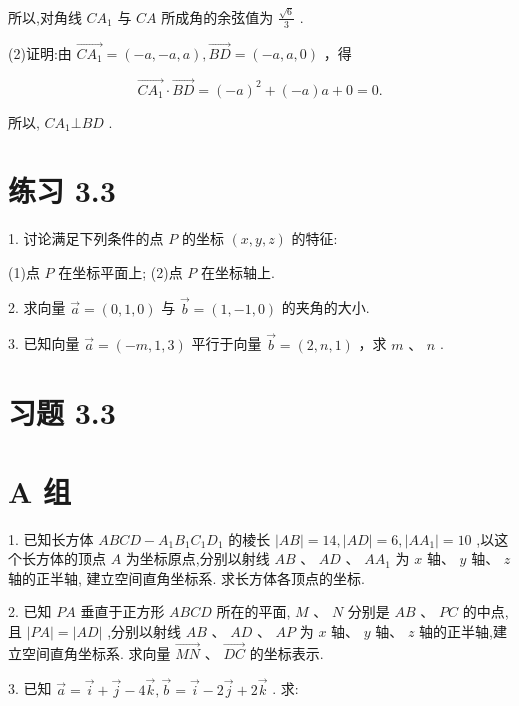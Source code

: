 \documentclass[10pt]{article}
\begin{document}
所以,对角线 \(C{A}_{1}\) 与 \({CA}\) 所成角的余弦值为 \(\frac{\sqrt{6}}{3}\) .

(2)证明:由 \(\overrightarrow{C{A}_{1}} = \left( {-a, - a,a}\right) ,\overrightarrow{BD} = \left( {-a,a,0}\right)\) ，得

\[
\overrightarrow{C{A}_{1}} \cdot  \overrightarrow{BD} = {\left( -a\right) }^{2} + \left( {-a}\right) a + 0 = 0.
\]

所以, \(C{A}_{1} \bot  {BD}\) .

\section*{练习 3.3}

1. 讨论满足下列条件的点 \(P\) 的坐标 \(\left( {x,y,z}\right)\) 的特征:

(1)点 \(P\) 在坐标平面上; (2)点 \(P\) 在坐标轴上.

2. 求向量 \(\overrightarrow{a} = \left( {0,1,0}\right)\) 与 \(\overrightarrow{b} = \left( {1, - 1,0}\right)\) 的夹角的大小.

3. 已知向量 \(\overrightarrow{a} = \left( {-m,1,3}\right)\) 平行于向量 \(\overrightarrow{b} = \left( {2,n,1}\right)\) ，求 \(m\text{ 、 }n\) .

\section*{习题 3.3}

\section*{A 组}

1. 已知长方体 \({ABCD} - {A}_{1}{B}_{1}{C}_{1}{D}_{1}\) 的棱长 \(\left| {AB}\right|  = {14},\left| {AD}\right|  = 6,\left| {A{A}_{1}}\right|  = {10}\) ,以这个长方体的顶点 \(A\) 为坐标原点,分别以射线 \({AB}\text{ 、 }{AD}\text{ 、 }A{A}_{1}\) 为 \(x\) 轴、 \(y\) 轴、 \(z\) 轴的正半轴, 建立空间直角坐标系. 求长方体各顶点的坐标.

2. 已知 \({PA}\) 垂直于正方形 \({ABCD}\) 所在的平面, \(M\text{ 、 }N\) 分别是 \({AB}\text{ 、 }{PC}\) 的中点,且 \(\left| {PA}\right|  = \left| {AD}\right|\) ,分别以射线 \({AB}\text{ 、 }{AD}\text{ 、 }{AP}\) 为 \(x\) 轴、 \(y\) 轴、 \(z\) 轴的正半轴,建立空间直角坐标系. 求向量 \(\overrightarrow{MN}\text{ 、 }\overrightarrow{DC}\) 的坐标表示.

3. 已知 \(\overrightarrow{a} = \overrightarrow{i} + \overrightarrow{j} - 4\overrightarrow{k},\overrightarrow{b} = \overrightarrow{i} - 2\overrightarrow{j} + 2\overrightarrow{k}\) . 求:
\end{document}
